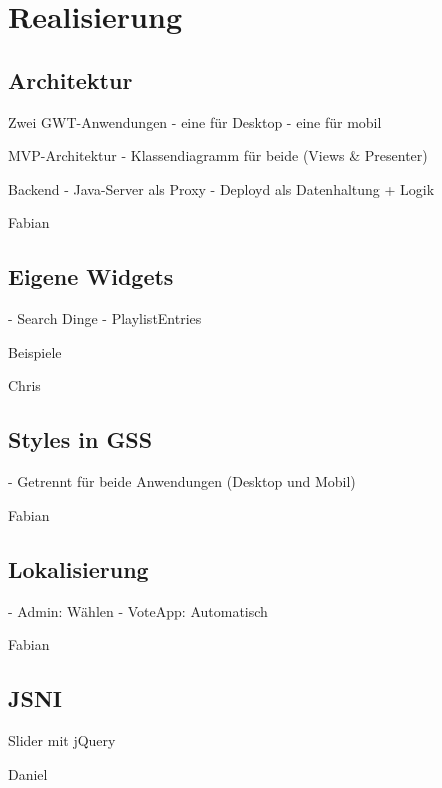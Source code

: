 \section{Realisierung}

\subsection{Architektur}

Zwei GWT-Anwendungen
- eine für Desktop
- eine für mobil

MVP-Architektur
- Klassendiagramm für beide (Views \& Presenter)

Backend
- Java-Server als Proxy
- Deployd als Datenhaltung + Logik

Fabian

\subsection{Eigene Widgets}
- Search Dinge
- PlaylistEntries

Beispiele

Chris

\subsection{Styles in GSS}
- Getrennt für beide Anwendungen (Desktop und Mobil)

Fabian

\subsection{Lokalisierung}
- Admin: Wählen
- VoteApp: Automatisch

Fabian

\subsection{JSNI}
Slider mit jQuery

Daniel